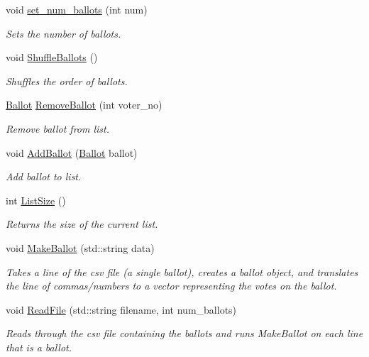 \begin{DoxyCompactItemize}
void \mbox{\hyperlink{class_ballot_list_abc969edf27fe35f064322fb02e1180a9}{set\+\_\+num\+\_\+ballots}} (int num)
\begin{DoxyCompactList}\small\item\em Sets the number of ballots. \end{DoxyCompactList}\item 
\mbox{\label{class_ballot_list_a087bcfd1a8849e23381896ce951d0053}} 
void \mbox{\hyperlink{class_ballot_list_a087bcfd1a8849e23381896ce951d0053}{Shuffle\+Ballots}} ()
\begin{DoxyCompactList}\small\item\em Shuffles the order of ballots. \end{DoxyCompactList}\item 
\mbox{\hyperlink{class_ballot}{Ballot}} \mbox{\hyperlink{class_ballot_list_a1d77010372fbcbf06a87028f6862f58c}{Remove\+Ballot}} (int voter\+\_\+no)
\begin{DoxyCompactList}\small\item\em Remove ballot from list. \end{DoxyCompactList}\item 
void \mbox{\hyperlink{class_ballot_list_a19237ad76f1a257ef200cec65a52471a}{Add\+Ballot}} (\mbox{\hyperlink{class_ballot}{Ballot}} ballot)
\begin{DoxyCompactList}\small\item\em Add ballot to list. \end{DoxyCompactList}\item 
\mbox{\label{class_ballot_list_acfe06cc28afdc840e73e59acc301bc97}} 
int \mbox{\hyperlink{class_ballot_list_acfe06cc28afdc840e73e59acc301bc97}{List\+Size}} ()
\begin{DoxyCompactList}\small\item\em Returns the size of the current list. \end{DoxyCompactList}\item 
void \mbox{\hyperlink{class_ballot_list_a928e7b3bbe5ae7607944e58ce84d35e7}{Make\+Ballot}} (std\+::string data)
\begin{DoxyCompactList}\small\item\em Takes a line of the csv file (a single ballot), creates a ballot object, and translates the line of commas/numbers to a vector representing the votes on the ballot. \end{DoxyCompactList}\item 
void \mbox{\hyperlink{class_ballot_list_a144f4d103b5fca451e2917656414951d}{Read\+File}} (std\+::string filename, int num\+\_\+ballots)
\begin{DoxyCompactList}\small\item\em Reads through the csv file containing the ballots and runs Make\+Ballot on each line that is a ballot. \end{DoxyCompactList}\end{DoxyCompactItemize}


